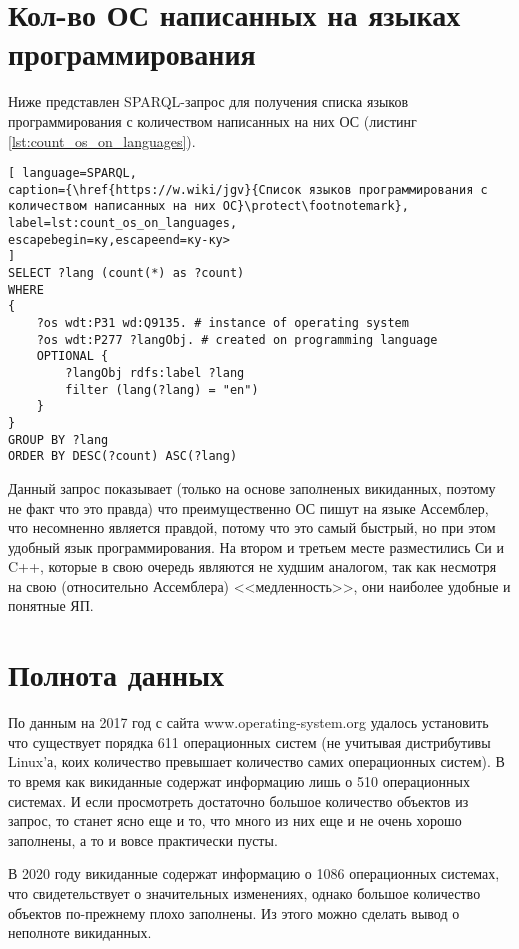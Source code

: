 \section{Кол-во ОС написанных на языках программирования}
Ниже представлен SPARQL-запрос для получения списка языков программирования с количеством написанных на них ОС (листинг \ref{lst:count_os_on_languages}).

\begin{lstlisting}[ language=SPARQL, 
caption={\href{https://w.wiki/jgv}{Список языков программирования с количеством написанных на них ОС}\protect\footnotemark},
label=lst:count_os_on_languages, 
escapebegin=ку,escapeend=ку-ку>
]
SELECT ?lang (count(*) as ?count)
WHERE 
{
	?os wdt:P31 wd:Q9135. # instance of operating system
	?os wdt:P277 ?langObj. # created on programming language
	OPTIONAL {
		?langObj rdfs:label ?lang
		filter (lang(?lang) = "en")
	}
}
GROUP BY ?lang
ORDER BY DESC(?count) ASC(?lang)
\end{lstlisting}

Данный запрос показывает (только на основе заполненых викиданных, поэтому не факт что это правда) что преимущественно ОС пишут на языке Ассемблер, что несомненно является правдой, потому что это самый быстрый, но при этом удобный язык программирования. На втором и третьем месте разместились Си и C++, которые в свою очередь являются не худшим аналогом, так как несмотря на свою (относительно Ассемблера) <<медленность>>, они наиболее удобные и понятные ЯП.


\section{Полнота данных}
По данным на 2017 год с сайта www.operating-system.org удалось установить что существует порядка 611 операционных систем (не учитывая дистрибутивы Linux'а, коих количество превышает количество самих операционных систем). В то время как викиданные содержат информацию лишь о 510 операционных системах. И если просмотреть достаточно большое количество объектов из запрос, то станет ясно еще и то, что много из них еще и не очень хорошо заполнены, а то и вовсе практически пусты.

В 2020 году викиданные содержат информацию о 1086 операционных системах, что свидетельствует о значительных изменениях, однако большое количество объектов по-прежнему плохо заполнены. Из этого можно сделать вывод о неполноте викиданных.

